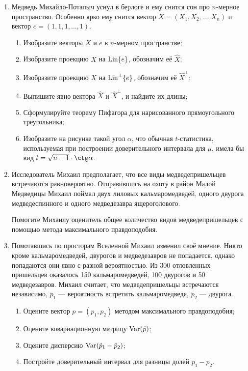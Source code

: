 \begin{enumerate}
\item Медведь Михайло-Потапыч уснул в берлоге и ему снится сон про $n$-мерное пространство.
Особенно ярко ему снится вектор $X=(X_1, X_2, \ldots, X_n)$ и вектор $e=(1, 1, 1, \ldots, 1)$.
\begin{enumerate}
\item Изобразите векторы $X$ и $e$ в $n$-мерном пространстве;
\item Изобразите проекцию $X$ на $\operatorname{\mathrm{Lin}} \{e\}$, обозначим её $\hat X$;
\item Изобразите проекцию $X$ на $\operatorname{\operatorname{\mathrm{Lin}}^{\perp}} \{e\}$, обозначим её $\hat X^{\perp}$;
\item Выпишите явно вектора $\hat X$ и $\hat X^{\perp}$, и найдите их длины;
\item Сформулируйте теорему Пифагора для нарисованного прямоугольного треугольника;
\item Изобразите на рисунке такой угол $\alpha$, что обычная $t$-статистика,
используемая при построении доверительного интервала для $\mu$, имела бы вид
$t = \sqrt{n-1} \cdot \ctg \alpha$.
\end{enumerate}

\item Исследователь Михаил предполагает, что все виды медведепришельцев встречаются
равновероятно. Отправившись на охоту в район Малой Медведицы Михаил поймал двух
лиловых кальмаромедведей, одного двурога медведеспинного и одного медведезавра
ящероголового.

Помогите Михаилу оценитель общее количество видов медведепришельцев с помощью метода
максимального правдоподобия.

\item Помотавшись по просторам Вселенной Михаил изменил своё мнение. Никто кроме
кальмаромедведей, двурогов и медведезавров не попадается, однако попадаются они
явно с разной вероятностью. Из 300 отловленных пришельцев оказалось 150 кальмаромедведей,
100 двурогов и 50 медведезавров. Михаил считает, что медведепришельцы встречаются
независимо, $p_1$ — вероятность встретить кальмаромедведя, $p_2$ — двурога.
\begin{enumerate}
\item Оцените вектор $p = (p_1, p_2)$ методом максимального правдоподобия;
\item Оцените ковариационную матрицу $\operatorname{Var}(\hat p)$;
\item Оцените дисперсию $\operatorname{Var}(\hat p_1 - \hat p_2)$;
\item Постройте доверительный интервал для разницы долей $p_1 - p_2$.
\end{enumerate}


\end{enumerate}
